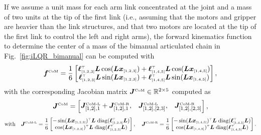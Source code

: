 \documentclass[10pt,a4paper]{article} %
\newcommand{\trsp}{{\scriptscriptstyle\top}}
\newcommand{\tp}[1]{\text{\tiny#1}}
\newcommand{\ty}[1]{{\scriptscriptstyle{#1}}}
\newcommand{\diag}{\mathrm{diag}}
\begin{document}
If we assume a unit mass for each arm link concentrated at the joint and a mass of two units at the tip of the first link (i.e., assuming that the motors and gripper are heavier than the link structures, and that two motors are located at the tip of the first link to control the left and right arms), the forward kinematics function to determine the center of a mass of the bimanual articulated chain in Fig.~\ref{fig:iLQR_bimanual} can be computed with
\begin{equation*}
	\bm{f}^\tp{CoM} = \frac{1}{6}\begin{bmatrix} 
	\bm{\ell}_\ty{[1,2,3]}^\trsp \bm{L} \cos(\bm{L}\bm{x}_\ty{[1,2,3]}) + 
	\bm{\ell}_\ty{[1,4,5]}^\trsp \bm{L} \cos(\bm{L}\bm{x}_\ty{[1,4,5]}) \\ 
	\bm{\ell}_\ty{[1,2,3]}^\trsp \bm{L} \sin(\bm{L}\bm{x}_\ty{[1,2,3]}) +
	\bm{\ell}_\ty{[1,4,5]}^\trsp \bm{L} \sin(\bm{L}\bm{x}_\ty{[1,4,5]})
	\end{bmatrix},
\end{equation*}
with the corresponding Jacobian matrix $\bm{J}^\tp{CoM}\in\mathbb{R}^{2\times 5}$ computed as
\begin{equation*}
	\bm{J}^\tp{CoM} = \begin{bmatrix} 
	\bm{J}^\tp{CoM-L}_{[1,2],1} + \bm{J}^\tp{CoM-R}_{[1,2],1}, & \bm{J}^\tp{CoM-L}_{[1,2],[2,3]}, & \bm{J}^\tp{CoM-R}_{[1,2],[2,3]}
	\end{bmatrix},
\end{equation*}
\begin{equation*}	
	\text{with}\quad 
	\bm{J}^\tp{CoM-L} = \frac{1}{6}\begin{bmatrix} 
	-\sin(\bm{L}\bm{x}_\ty{[1,2,3]})^\trsp \bm{L} \; \diag(\bm{\ell}_\ty{[1,2,3]}^\trsp \bm{L}) \\ 
	\cos(\bm{L}\bm{x}_\ty{[1,2,3]})^\trsp \bm{L} \; \diag(\bm{\ell}_\ty{[1,2,3]}^\trsp \bm{L})
	\end{bmatrix},\quad
	\bm{J}^\tp{CoM-R} = \frac{1}{6}\begin{bmatrix} 
	-\sin(\bm{L}\bm{x}_\ty{[1,4,5]})^\trsp \bm{L} \; \diag(\bm{\ell}_\ty{[1,4,5]}^\trsp \bm{L}) \\ 
	\cos(\bm{L}\bm{x}_\ty{[1,4,5]})^\trsp \bm{L} \; \diag(\bm{\ell}_\ty{[1,4,5]}^\trsp \bm{L})
	\end{bmatrix}.
\end{equation*}
\end{document}
